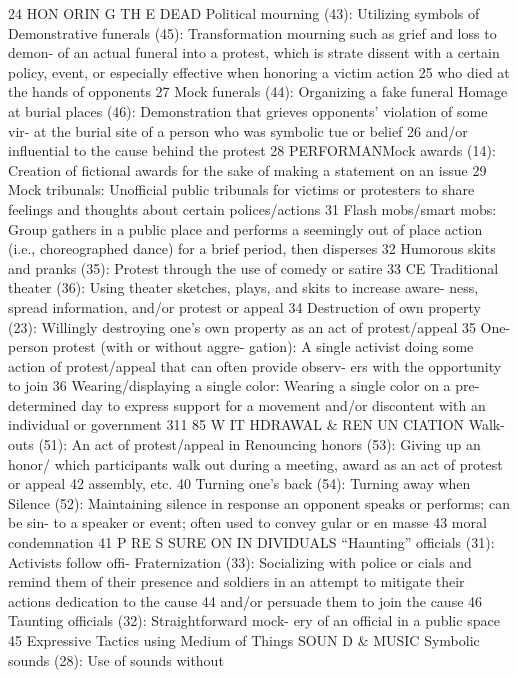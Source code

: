 \documentclass[twoside,a4paper,12pt,fleqn,openany]{extbook}
\begin{document}
 24
HON ORIN G TH E DEAD
Political mourning (43): Utilizing symbols of
 Demonstrative funerals (45): Transformation
mourning such as grief and loss to demon-
 of an actual funeral into a protest, which is
strate dissent with a certain policy, event, or
 especially effective when honoring a victim
action
 25
 who died at the hands of opponents
 27
Mock funerals (44): Organizing a fake funeral
 Homage at burial places (46): Demonstration
that grieves opponents’ violation of some vir-
 at the burial site of a person who was symbolic
tue or belief
 26
 and/or influential to the cause behind the
protest
 28
PERFORMANMock awards (14): Creation of fictional awards
for the sake of making a statement on an
issue
 29
Mock tribunals: Unofficial public tribunals for
victims or protesters to share feelings and
thoughts about certain polices/actions
 31
Flash mobs/smart mobs: Group gathers in a
public place and performs a seemingly out of
place action (i.e., choreographed dance) for a
brief period, then disperses
 32
Humorous skits and pranks (35): Protest
through the use of comedy or satire
 33
CE
Traditional theater (36): Using theater
sketches, plays, and skits to increase aware-
ness, spread information, and/or protest or
appeal
 34
Destruction of own property (23): Willingly
destroying one’s own property as an act of
protest/appeal
 35
One-person protest (with or without aggre-
gation): A single activist doing some action of
protest/appeal that can often provide observ-
ers with the opportunity to join
 36
Wearing/displaying a single color: Wearing a
single color on a pre-determined day to express
support for a movement and/or discontent with
an individual or government
 311
85
W IT HDRAWAL & REN UN CIATION
Walk-outs (51): An act of protest/appeal in
 Renouncing honors (53): Giving up an honor/
which participants walk out during a meeting,
 award as an act of protest or appeal
 42
assembly, etc.
 40
Turning one’s back (54): Turning away when
Silence (52): Maintaining silence in response
 an opponent speaks or performs; can be sin-
to a speaker or event; often used to convey
 gular or en masse
 43
moral condemnation
 41
P RE S SURE ON IN DIVIDUALS
“Haunting” officials (31): Activists follow offi-
 Fraternization (33): Socializing with police or
cials and remind them of their presence and
 soldiers in an attempt to mitigate their actions
dedication to the cause
 44
 and/or persuade them to join the cause 46
Taunting officials (32): Straightforward mock-
ery of an official in a public space
 45
Expressive Tactics using Medium of Things
SOUN D & MUSIC
Symbolic sounds (28): Use of sounds without
\end{document}

